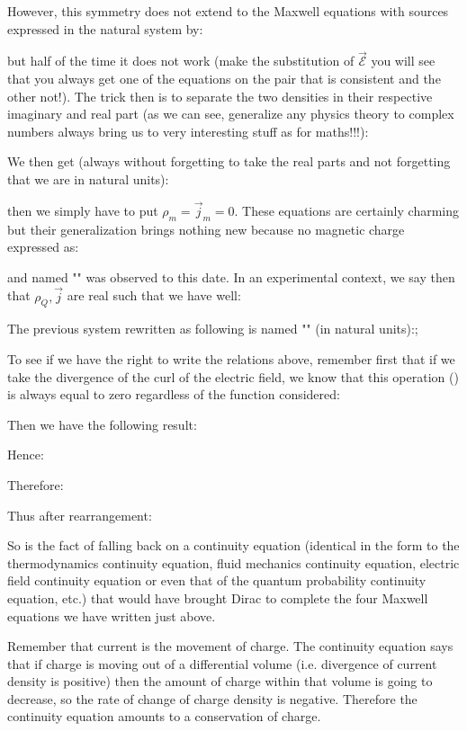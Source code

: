 	However, this symmetry does not extend to the Maxwell equations with sources expressed in the natural system by:
	
	but half of the time it does not work (make the substitution of $\vec{\mathcal{E}}$ you will see that you always get one of the equations on the pair that is consistent and the other not!). The trick then is to separate the two densities in their respective imaginary and real part (as we can see, generalize any physics theory to complex numbers always bring us to very interesting stuff as for maths!!!):
	
	We then get (always without forgetting to take the real parts and not forgetting that we are in natural units):
	
	then we simply have to put $\rho_m=\vec{j}_m=0$. These equations are certainly charming but their generalization brings nothing new because no magnetic charge expressed as:
	
	and named "" was observed to this date. In an experimental context, we say then that $\rho_Q,\vec{j}$ are real such that we have well:
	
	The previous system rewritten as following is named "" (in natural units):;
	
	To see if we have the right to write the relations above, remember first that if we take the divergence of the curl of the electric field, we know that this operation () is always equal to zero regardless of the function considered:
	
	Then we have the following result:
	
	Hence:
	
	Therefore:
	
	Thus after rearrangement:
	
	So is the fact of falling back on a continuity equation (identical in the form to the thermodynamics continuity equation, fluid mechanics continuity equation, electric field continuity equation or even that of the quantum probability continuity equation, etc.) that would have brought Dirac to complete the four Maxwell equations we have written just above.
	
	Remember that current is the movement of charge. The continuity equation says that if charge is moving out of a differential volume (i.e. divergence of current density is positive) then the amount of charge within that volume is going to decrease, so the rate of change of charge density is negative. Therefore the continuity equation amounts to a conservation of charge.
	
